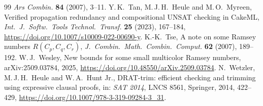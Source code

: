 \documentclass[11pt]{amsart}
\theoremstyle{definition}
\theoremstyle{remark}
\begin{document}
\begin{thebibliography}{99}
\emph{Ars Combin.} \textbf{84} (2007), 3--11.
 Y.\,K.~Tan, M.\,J.\,H.~Heule and M.\,O.~Myreen, Verified propagation redundancy and compositional UNSAT checking in
CakeML, \emph{Int.\ J.\ Softw.\ Tools Technol.\ Transf.} \textbf{25} (2023), 167--184, \url{https://doi.org/10.1007/s10009-022-00690-y}.
 K.-K.~Tse, A note on some Ramsey numbers $R(C_p,C_q,C_r)$, \emph{J.\ Combin.\ Math.\ Combin.\ Comput.} \textbf{62}
(2007), 189--192.
 W.\,J.~Wesley, New bounds for some small multicolor Ramsey numbers, arXiv:2509.03784, 2025,
\url{https://doi.org/10.48550/arXiv.2509.03784}.
 N.~Wetzler, M.\,J.\,H.~Heule and W.\,A.~Hunt Jr., DRAT-trim: efficient checking and trimming using expressive
clausal proofs, in: \emph{SAT 2014}, LNCS 8561, Springer, 2014, 422--429, \url{https://doi.org/10.1007/978-3-319-09284-3_31}.
\end{thebibliography}
\end{document}
